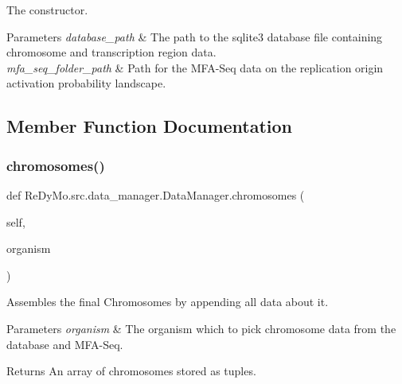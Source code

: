 The constructor. 


\begin{DoxyParams}{Parameters}
{\em database\+\_\+path} & The path to the sqlite3 database file containing chromosome and transcription region data. \\
\hline
{\em mfa\+\_\+seq\+\_\+folder\+\_\+path} & Path for the M\+F\+A-\/\+Seq data on the replication origin activation probability landscape. \\
\hline
\end{DoxyParams}


\subsection{Member Function Documentation}
\mbox{\label{classReDyMo_1_1src_1_1data__manager_1_1DataManager_ae36fd09e981be096578336def0a04069}} 
\subsubsection{\texorpdfstring{chromosomes()}{chromosomes()}}
{\footnotesize\ttfamily def Re\+Dy\+Mo.\+src.\+data\+\_\+manager.\+Data\+Manager.\+chromosomes (\begin{DoxyParamCaption}\item[{}]{self,  }\item[{}]{organism }\end{DoxyParamCaption})}



Assembles the final Chromosomes by appending all data about it. 


\begin{DoxyParams}{Parameters}
{\em organism} & The organism which to pick chromosome data from the database and M\+F\+A-\/\+Seq. \\
\hline
\end{DoxyParams}
\begin{DoxyReturn}{Returns}
An array of chromosomes stored as tuples. 
\end{DoxyReturn}
\mbox{\label{classReDyMo_1_1src_1_1data__manager_1_1DataManager_ac8933073eed38e7669e162884d89cda8}} 
